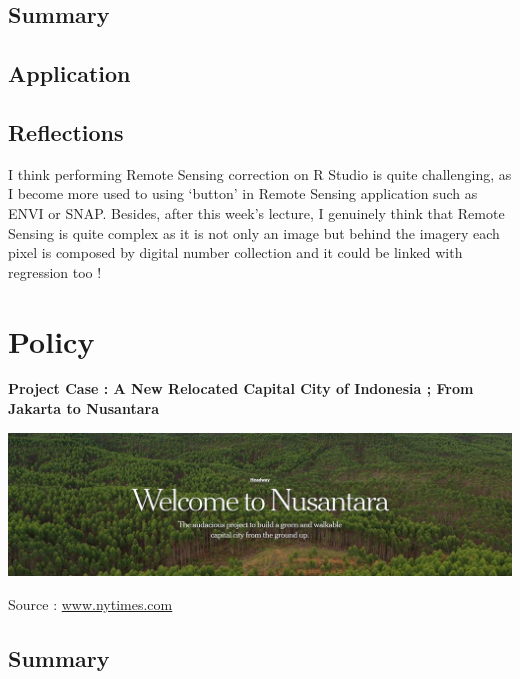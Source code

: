 \documentclass[
  letterpaper,
  DIV=11,
  numbers=noendperiod]{scrreprt}
\begin{document}
\hypertarget{summary-2}{%
\section{Summary}\label{summary-2}}

\hypertarget{application-1}{%
\section{Application}\label{application-1}}

\hypertarget{reflections-1}{%
\section{Reflections}\label{reflections-1}}

I think performing Remote Sensing correction on R Studio is quite
challenging, as I become more used to using `button' in Remote Sensing
application such as ENVI or SNAP. Besides, after this week's lecture, I
genuinely think that Remote Sensing is quite complex as it is not only
an image but behind the imagery each pixel is composed by digital number
collection and it could be linked with regression too !


\hypertarget{policy}{%
\chapter{Policy}\label{policy}}

\textbf{Project Case : A New Relocated Capital City of Indonesia ; From
Jakarta to Nusantara}

\includegraphics{images/clipboard-546673402.png}

Source :
\href{https://www.nytimes.com/interactive/2023/05/16/headway/indonesia-nusantara-jakarta.html}{www.nytimes.com}

\hypertarget{summary-3}{%
\section{Summary}\label{summary-3}}
\end{document}
